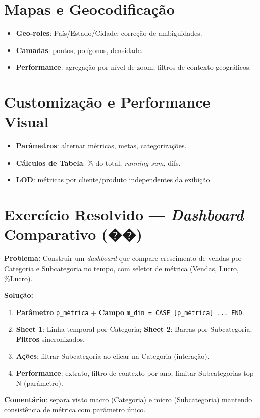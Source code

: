 \section{Mapas e Geocodificação}
\begin{itemize}[leftmargin=*]
  \item \textbf{Geo-roles}: País/Estado/Cidade; correção de ambiguidades.
  \item \textbf{Camadas}: pontos, polígonos, densidade.
  \item \textbf{Performance}: agregação por nível de zoom; filtros de contexto geográficos.
\end{itemize}

\section{Customização e Performance Visual}
\begin{itemize}[leftmargin=*]
  \item \textbf{Parâmetros}: alternar métricas, metas, categorizações.
  \item \textbf{Cálculos de Tabela}: \% do total, \textit{running sum}, difs.
  \item \textbf{LOD}: métricas por cliente/produto independentes da exibição.
\end{itemize}

\section{Exercício Resolvido — \textit{Dashboard} Comparativo (��)}
\begin{SolvedBox}
\textbf{Problema:} Construir um \textit{dashboard} que compare crescimento de vendas por Categoria e Subcategoria no tempo, com seletor de métrica (Vendas, Lucro, \%Lucro).

\textbf{Solução:}
\begin{enumerate}[leftmargin=*]
  \item \textbf{Parâmetro} \texttt{p\_métrica} + \textbf{Campo} \texttt{m\_din = CASE [p\_métrica] ... END}.
  \item \textbf{Sheet 1}: Linha temporal por Categoria; \textbf{Sheet 2}: Barras por Subcategoria; \textbf{Filtros} sincronizados.
  \item \textbf{Ações}: filtrar Subcategoria ao clicar na Categoria (interação).
  \item \textbf{Performance}: extrato, filtro de contexto por ano, limitar Subcategorias top-N (parâmetro).
\end{enumerate}
\textbf{Comentário}: separa visão macro (Categoria) e micro (Subcategoria) mantendo consistência de métrica com parâmetro único.
\end{SolvedBox}

